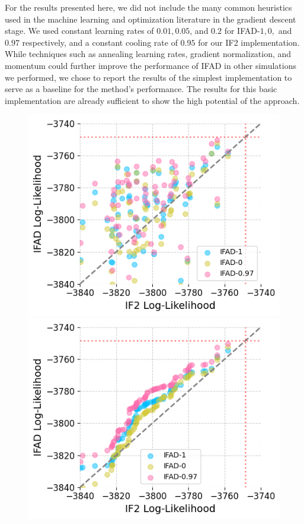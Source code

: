 \documentclass[9pt,twocolumn,pnasresearcharticle]{pnas-new}
\newcommand\arxiv[2]{#2} %
\begin{document}
For the results presented here, we did not include the many common heuristics used in the machine learning and optimization literature in the gradient descent stage.
We used constant learning rates of $0.01, 0.05$, and $0.2$ for IFAD-$1,0,$ and $0.97$ respectively, and a constant cooling rate of $0.95$ for our IF2 implementation.
While techniques such as annealing learning rates, gradient normalization, and momentum could further improve the performance of IFAD in other simulations we performed, we chose to report the results of the simplest implementation to serve as a baseline for the method's performance.
The results for this basic implementation are already sufficient to show the high potential of the approach.

\begin{figure}[htbp!]
    \includegraphics[width=\arxiv{8cm}{\textwidth/\real{4.2}}]{imgs/095/pairs.png}
    \includegraphics[width=\arxiv{8cm}{\textwidth/\real{4.2}}]{imgs/095/qq.png}

\end{figure}
\end{document}

